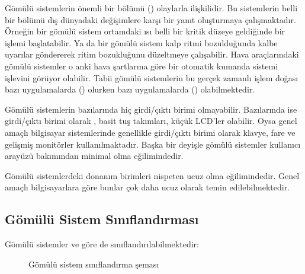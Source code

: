 \documentclass[letterpaper,10pt,turkish]{sphinxmanual}
\begin{document}
\begin{description}
\sphinxAtStartPar
Gömülü sistemlerin önemli bir bölümü  () olaylarla ilişkilidir. Bu
sistemlerin belli bir bölümü dış dünyadaki değişimlere karşı bir yanıt oluşturmaya çalışmaktadır.
Örneğin bir gömülü sistem ortamdaki ısı belli bir kritik düzeye geldiğinde bir işlemi
başlatabilir. Ya da bir gömülü sistem kalp ritmi bozulduğunda kalbe uyarılar göndererek ritim
bozukluğunu düzeltmeye çalışabilir. Hava araçlarındaki gömülü sistemler o anki hava şartlarına
göre bir otomatik kumanda sistemi işlevini görüyor olabilir. Tabii gömülü sistemlerin bu gerçek
zamanlı işlem doğası bazı uygulamalarda  () olurken bazı uygulamalarda
 () olabilmektedir.

\sphinxAtStartPar
Gömülü sistemlerin bazılarında hiç girdi/çıktı birimi olmayabilir. Bazılarında ise girdi/çıktı
birimi olarak , basit tuş takımları, küçük LCD’ler olabilir. Oysa genel amaçlı
bilgisayar sistemlerinde genellikle girdi/çıktı birimi olarak klavye, fare ve gelişmiş monitörler
kullanılmaktadır. Başka bir deyişle gömülü sistemler kullanıcı arayüzü bakımından minimal olma
eğilimindedir.

\sphinxAtStartPar
Gömülü sistemlerdeki donanım birimleri nispeten ucuz olma eğilimindedir. Genel amaçlı
bilgisayarlara göre bunlar çok daha ucuz olarak temin edilebilmektedir.

\end{description}


\subsection{Gömülü Sistem Sınıflandırması}
\label{\detokenize{introduction:gomulu-sistem-siniflandirmasi}}
\sphinxAtStartPar
Gömülü sistemler  ve  göre de
sınıflandırılabilmektedir:

\begin{figure}[htbp]
\centering
\capstart

\noindent{}
\caption{Gömülü sistem sınıflandırma şeması}\label{\detokenize{introduction:id1}}\end{figure}
\end{document}
